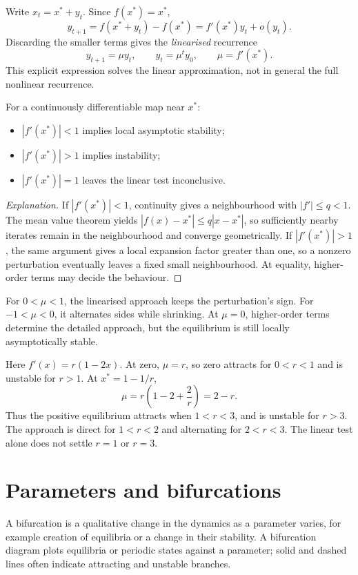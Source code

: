 Write $x_t=x^*+y_t$. Since $f(x^*)=x^*$,
\[
y_{t+1}=f(x^*+y_t)-f(x^*)=f'(x^*)y_t+o(y_t).
\]
Discarding the smaller terms gives the \emph{linearised} recurrence
\[
y_{t+1}=\mu y_t,\qquad y_t=\mu^t y_0,\qquad \mu=f'(x^*).
\]
This explicit expression solves the linear approximation, not in general
the full nonlinear recurrence.

\begin{proposition}
For a continuously differentiable map near $x^*$:
\begin{itemize}
\item $|f'(x^*)|<1$ implies local asymptotic stability;
\item $|f'(x^*)|>1$ implies instability;
\item $|f'(x^*)|=1$ leaves the linear test inconclusive.
\end{itemize}
\end{proposition}
\begin{proof}[Explanation]
If $|f'(x^*)|<1$, continuity gives a neighbourhood with $|f'|\leq q<1$.
The mean value theorem yields $|f(x)-x^*|\leq q|x-x^*|$, so sufficiently
nearby iterates remain in the neighbourhood and converge geometrically.
If $|f'(x^*)|>1$, the same argument gives a local expansion factor greater
than one, so a nonzero perturbation eventually leaves a fixed small
neighbourhood. At equality, higher-order terms may decide the behaviour.
\end{proof}
For $0<\mu<1$, the linearised approach keeps the perturbation's sign.
For $-1<\mu<0$, it alternates sides while shrinking. At $\mu=0$,
higher-order terms determine the detailed approach, but the equilibrium
is still locally asymptotically stable.

\begin{example}
Here $f'(x)=r(1-2x)$. At zero, $\mu=r$, so zero attracts for $0<r<1$
and is unstable for $r>1$. At $x^*=1-1/r$,
\[
\mu=r\left(1-2+\frac2r\right)=2-r.
\]
Thus the positive equilibrium attracts when $1<r<3$, and is unstable for
$r>3$. The approach is direct for $1<r<2$ and alternating for $2<r<3$.
The linear test alone does not settle $r=1$ or $r=3$.
\end{example}

\section{Parameters and bifurcations}
\begin{definition}[Bifurcation]
A bifurcation is a qualitative change in the dynamics as a parameter varies,
for example creation of equilibria or a change in their stability.
A bifurcation diagram plots equilibria or periodic states against a parameter;
solid and dashed lines often indicate attracting and unstable branches.
\end{definition}

